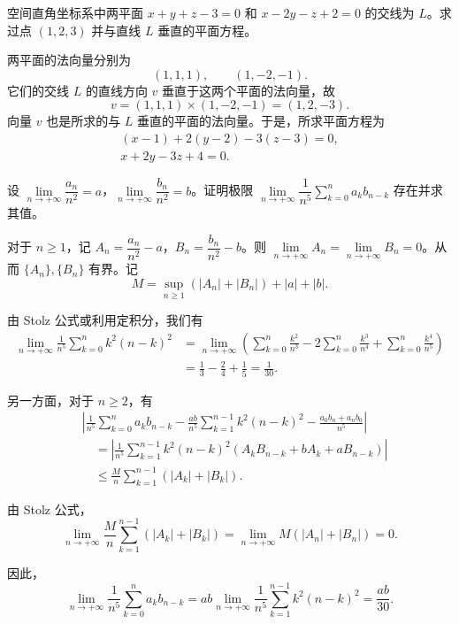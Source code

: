 
空间直角坐标系中两平面 $x+y+z-3=0$ 和 $x-2y-z+2=0$ 的交线为 $L$。求过点 $(1,2,3)$ 并与直线 $L$ 垂直的平面方程。
\begin{solution}
两平面的法向量分别为
\[
(1,1,1),\qquad (1,-2,-1).
\]
它们的交线 $L$ 的直线方向 $v$ 垂直于这两个平面的法向量，故
\[
v=(1,1,1)\times(1,-2,-1)=(1,2,-3).
\]
向量 $v$ 也是所求的与 $L$ 垂直的平面的法向量。于是，所求平面方程为
\begin{gather*}
(x-1)+2(y-2)-3(z-3)=0,\\
x+2y-3z+4=0.
\end{gather*}
\end{solution}

设 $\lim\limits_{n\to+\infty}\dfrac{a_n}{n^2}=a$，$\lim\limits_{n\to+\infty}\dfrac{b_n}{n^2}=b$。证明极限 $\lim\limits_{n\to+\infty}\dfrac{1}{n^5}\sum\limits_{k=0}^{n}a_kb_{n-k}$ 存在并求其值。
\begin{solution}
对于 $n\geqslant 1$，记 $A_n=\dfrac{a_n}{n^2}-a$，$B_n=\dfrac{b_n}{n^2}-b$。则 $\lim\limits_{n\to+\infty}A_n=\lim\limits_{n\to+\infty}B_n=0$。从而 $\{A_n\},\{B_n\}$ 有界。记
\[
M=\sup_{n\geqslant 1}\left(|A_n|+|B_n|\right)+|a|+|b|.
\]

由 Stolz 公式或利用定积分，我们有
\begin{align*}
\lim_{n\to+\infty}\frac{1}{n^5}\sum_{k=0}^{n}k^2(n-k)^2
&=\lim_{n\to+\infty}\left(\sum_{k=0}^{n}\frac{k^2}{n^3}-2\sum_{k=0}^{n}\frac{k^3}{n^4}+\sum_{k=0}^{n}\frac{k^4}{n^5}\right)\\
&=\frac{1}{3}-\frac{2}{4}+\frac{1}{5}=\frac{1}{30}.
\end{align*}

另一方面，对于 $n\geqslant 2$，有
\begin{align*}
&\left|\frac{1}{n^5}\sum_{k=0}^{n}a_kb_{n-k}-\frac{ab}{n^5}\sum_{k=1}^{n-1}k^2(n-k)^2-\frac{a_0b_n+a_nb_0}{n^5}\right|\\
&\quad=\left|\frac{1}{n^5}\sum_{k=1}^{n-1}k^2(n-k)^2\left(A_kB_{n-k}+bA_k+aB_{n-k}\right)\right|\\
&\quad\leqslant\frac{M}{n}\sum_{k=1}^{n-1}\left(|A_k|+|B_k|\right).
\end{align*}

由 Stolz 公式，
\[
\lim_{n\to+\infty}\frac{M}{n}\sum_{k=1}^{n-1}\left(|A_k|+|B_k|\right)=\lim_{n\to+\infty}M\left(|A_n|+|B_n|\right)=0.
\]

因此，
\[
\lim_{n\to+\infty}\frac{1}{n^5}\sum_{k=0}^{n}a_kb_{n-k}=ab\lim_{n\to+\infty}\frac{1}{n^5}\sum_{k=1}^{n-1}k^2(n-k)^2=\frac{ab}{30}.
\]
\end{solution}

